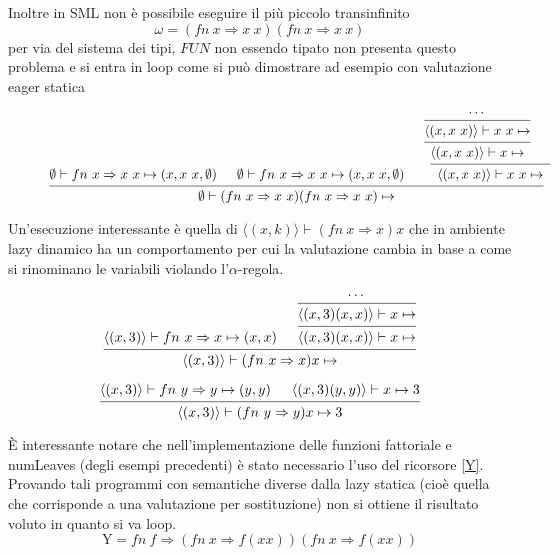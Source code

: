 \documentclass[a4paper]{article}
\begin{document}
	Inoltre in SML non è possibile eseguire il più piccolo transinfinito 
	\[ \omega = (fn \ x \Rightarrow x \ x)(fn \ x \Rightarrow x \ x) \]
	per via del sistema dei tipi, $FUN$ non essendo tipato non presenta questo problema e si entra in loop come si può dimostrare ad esempio con valutazione eager statica
	
	\begin{figure}[ht]
	\[
		\begin{prooftree}
			\hypo{\emptyset \vdash fn \ x \Rightarrow x \ x \mapsto (x, x \ x, \emptyset)}

			\hypo{\emptyset \vdash fn \ x \Rightarrow x \ x \mapsto (x, x \ x, \emptyset)}

			\hypo{\cdots}
			\infer1[]{\langle (x, x \ x) \rangle \vdash x \ x \mapsto}
			\infer1[]{\langle (x, x \ x) \rangle \vdash x \mapsto}
			\hypo{}
			\infer2[]{\langle (x, x \ x) \rangle \vdash x \ x \mapsto }

			\infer3[]{\emptyset \vdash (fn \ x \Rightarrow x \ x)(fn \ x \Rightarrow x \ x) \mapsto }

		\end{prooftree}
	\]
	\end{figure}
	
	Un'esecuzione interessante è quella di $\langle (x, k) \rangle \vdash (fn \ x \Rightarrow x)x$ che in ambiente lazy dinamico ha un comportamento per cui la valutazione cambia in base a come si rinominano le variabili violando l'$\alpha$-regola.  

	\begin{figure}[H]
	\[
		\begin{prooftree}
			\hypo{\langle (x,3) \rangle \vdash fn \ x \Rightarrow x \mapsto (x,x)}
			\hypo{\cdots}
			\infer1[]{\langle (x,3)(x,x) \rangle \vdash x \mapsto }
			\infer1[]{\langle (x,3)(x,x) \rangle \vdash x \mapsto }
			\infer2[]{\langle (x,3) \rangle \vdash (fn \ x \Rightarrow x) x \mapsto }
		\end{prooftree}
	\]
	\end{figure}


	\begin{figure}[H]
	\[
		\begin{prooftree}
			\hypo{\langle (x,3) \rangle \vdash fn \ y \Rightarrow y \mapsto (y,y)}
			\hypo{\langle (x,3)(y,y) \rangle \vdash x \mapsto 3}
			\infer2[]{\langle (x,3) \rangle \vdash (fn \ y \Rightarrow y)x \mapsto 3}
		\end{prooftree}
	\]
	\end{figure}

	È interessante notare che nell'implementazione delle funzioni fattoriale e numLeaves (degli esempi precedenti) è stato necessario l'uso del ricorsore \eqref{Y}. Provando tali programmi con semantiche diverse dalla lazy statica (cioè quella che corrisponde a una valutazione per sostituzione) non si ottiene il risultato voluto in quanto si va loop. 
	\begin{equation} \label{Y}
	\mathrm{Y}= fn \ f \Rightarrow (fn \ x \Rightarrow f(xx))(fn \ x \Rightarrow f(xx))
	\end{equation}
\end{document}
